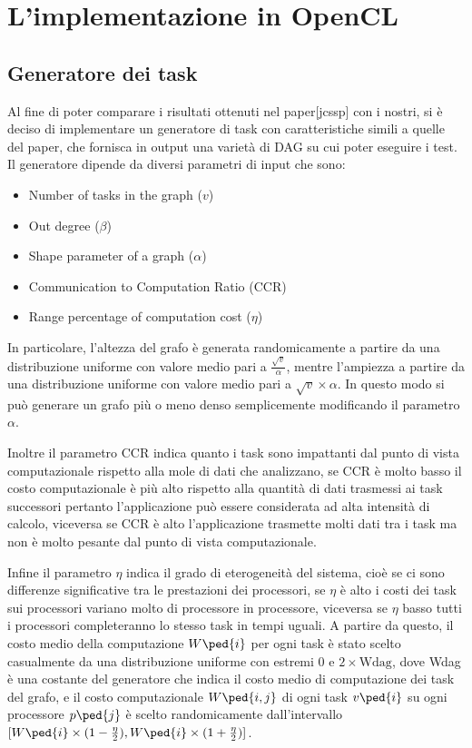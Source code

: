 \chapter{L'implementazione in OpenCL}
\vspace{4cm}


\section{Generatore dei task}
Al fine di poter comparare i risultati ottenuti nel paper[jcssp] con i nostri, si è deciso di implementare un generatore di task con caratteristiche simili a quelle del paper, che fornisca in output una varietà di DAG su cui poter eseguire i test.
\\
Il generatore dipende da diversi parametri di input che sono:
\begin{itemize}
	\item{Number of tasks in the graph ($v$)}
	\item{Out degree ($\beta$)}
	\item{Shape parameter of a graph ($\alpha$)}
	\item{Communication to Computation Ratio (CCR)}
	\item{Range percentage of computation cost ($\eta$)}
\end{itemize}

In particolare, l'altezza del grafo è generata randomicamente a partire da una distribuzione uniforme con valore medio pari a $\frac{\sqrt{v}}{\alpha}$, mentre l'ampiezza a partire da una distribuzione uniforme con valore medio pari a $\sqrt{v}\times\alpha$.
In questo modo si può generare un grafo più o meno denso semplicemente modificando il parametro $\alpha$.


Inoltre il parametro CCR indica quanto i task sono impattanti dal punto di vista computazionale rispetto alla mole di dati che analizzano, se CCR è molto basso il costo computazionale è più alto rispetto alla quantità di dati trasmessi ai task successori pertanto l'applicazione può essere considerata ad alta intensità di calcolo, viceversa se CCR è alto l'applicazione trasmette molti dati tra i task ma non è molto pesante dal punto di vista computazionale.

Infine il parametro $\eta$ indica il grado di eterogeneità del sistema, cioè se ci sono differenze significative tra le prestazioni dei processori, se $\eta$ è alto i costi dei task sui processori variano molto di processore in processore, viceversa se $\eta$ basso tutti i processori completeranno lo stesso task in tempi uguali. 
A partire da questo, il costo medio della computazione $W\ped{i}$ per ogni task è stato scelto casualmente da una distribuzione uniforme con estremi $0$ e $2 \times \text{Wdag}$, dove Wdag è una costante del generatore che indica il costo medio di computazione dei task del grafo, e il costo computazionale $W\ped{i,j}$ di ogni task $v\ped{i}$ su ogni processore $p\ped{j}$ è scelto randomicamente dall'intervallo $[W\ped{i}\times (1-\frac{\eta}{2}), W\ped{i}\times (1+\frac{\eta}{2})]$.

